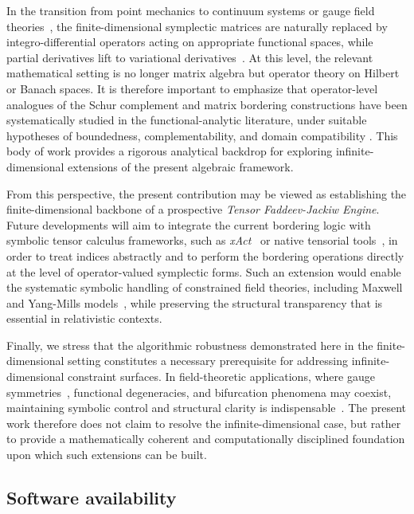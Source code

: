 \documentclass[11pt,a4paper]{article}
\begin{document}
In the transition from point mechanics to continuum systems or gauge field theories~\cite{Witten1989,Henneaux1992}, the finite-dimensional symplectic matrices are naturally replaced by integro-differential operators acting on appropriate functional spaces, while partial derivatives lift to variational derivatives~\cite{Olver1993,Saunders1989}. At this level, the relevant mathematical setting is no longer matrix algebra but operator theory on Hilbert or Banach spaces. It is therefore important to emphasize that operator-level analogues of the Schur complement and matrix bordering constructions have been systematically studied in the functional-analytic literature, under suitable hypotheses of boundedness, complementability, and domain compatibility \cite{Bacuta2009,DouglasFillmore1974}. This body of work provides a rigorous analytical backdrop for exploring infinite-dimensional extensions of the present algebraic framework.



From this perspective, the present contribution may be viewed as establishing the finite-dimensional backbone of a prospective \emph{Tensor Faddeev-Jackiw Engine}. Future developments will aim to integrate the current bordering logic with symbolic tensor calculus frameworks, such as \textit{xAct}~\cite{mgarcia} or native tensorial tools~\cite{Nakahara2003}, in order to treat indices abstractly and to perform the bordering operations directly at the level of operator-valued symplectic forms. Such an extension would enable the systematic symbolic handling of constrained field theories, including Maxwell and Yang-Mills models~\cite{Witten1989,Schwarz1993}, while preserving the structural transparency that is essential in relativistic contexts.


Finally, we stress that the algorithmic robustness demonstrated here in the finite-dimensional setting constitutes a necessary prerequisite for addressing infinite-dimensional constraint surfaces. In field-theoretic applications, where gauge symmetries~\cite{Henneaux1992,Rothe1997}, functional degeneracies, and bifurcation phenomena may coexist, maintaining symbolic control and structural clarity is indispensable~\cite{Kuznetsov2004,Seydel2010}. The present work therefore does not claim to resolve the infinite-dimensional case, but rather to provide a mathematically coherent and computationally disciplined foundation upon which such extensions can be built.

\subsection*{Software availability}
\end{document}
